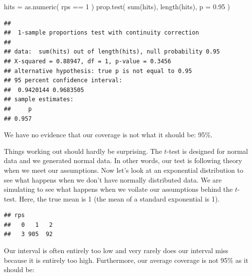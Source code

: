 \documentclass[
]{book}
\newenvironment{Shaded}{\begin{snugshade}}{\end{snugshade}}
\newcommand{\AttributeTok}[1]{\textcolor[rgb]{0.77,0.63,0.00}{#1}}
\newcommand{\DecValTok}[1]{\textcolor[rgb]{0.00,0.00,0.81}{#1}}
\newcommand{\FloatTok}[1]{\textcolor[rgb]{0.00,0.00,0.81}{#1}}
\newcommand{\FunctionTok}[1]{\textcolor[rgb]{0.00,0.00,0.00}{#1}}
\newcommand{\NormalTok}[1]{#1}
\newcommand{\OtherTok}[1]{\textcolor[rgb]{0.56,0.35,0.01}{#1}}
\newcommand{\SpecialCharTok}[1]{\textcolor[rgb]{0.00,0.00,0.00}{#1}}
\begin{document}
\begin{Shaded}
\begin{Highlighting}[]
\NormalTok{hits }\OtherTok{=} \FunctionTok{as.numeric}\NormalTok{( rps }\SpecialCharTok{==} \DecValTok{1}\NormalTok{ )}
\FunctionTok{prop.test}\NormalTok{( }\FunctionTok{sum}\NormalTok{(hits), }\FunctionTok{length}\NormalTok{(hits), }\AttributeTok{p =} \FloatTok{0.95}\NormalTok{ )}
\end{Highlighting}
\end{Shaded}

\begin{verbatim}
## 
##  1-sample proportions test with continuity correction
## 
## data:  sum(hits) out of length(hits), null probability 0.95
## X-squared = 0.88947, df = 1, p-value = 0.3456
## alternative hypothesis: true p is not equal to 0.95
## 95 percent confidence interval:
##  0.9420144 0.9683505
## sample estimates:
##     p 
## 0.957
\end{verbatim}

We have no evidence that our coverage is not what it should be: 95\%.

Things working out should hardly be surprising. The \(t\)-test is designed for
normal data and we generated normal data. In other words, our test is
following theory when we meet our assumptions. Now let's look at an
exponential distribution to see what happens when we don't have normally
distributed data. We are simulating to see what happens when we voilate
our assumptions behind the \(t\)-test. Here, the true mean is 1 (the mean of a
standard exponential is 1).

\begin{Shaded}
\end{Shaded}

\begin{verbatim}
## rps
##   0   1   2 
##   3 905  92
\end{verbatim}

Our interval is often entirely too low and very rarely does our interval miss
because it is entirely too high. Furthermore, our average coverage is not
95\% as it should be:
\end{document}
